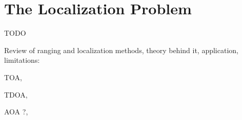 

\section{The Localization Problem}
\label{chapter:problem}


TODO

Review of ranging and localization methods, theory behind it, application, limitations: 

TOA,
 
TDOA,

AOA ?,

